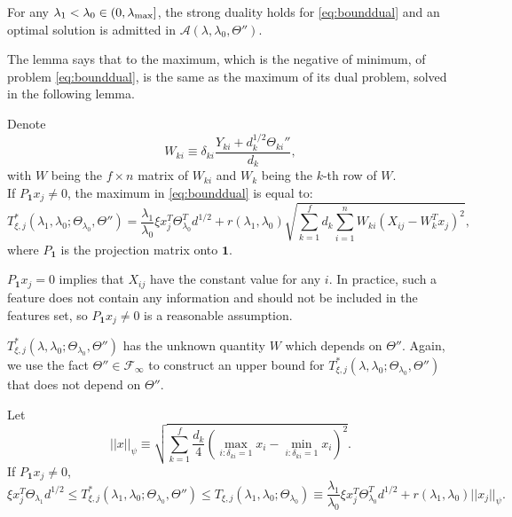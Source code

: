 \begin{lemma}
    \label{lem:2}
    For any $\lambda_1<\lambda_{0}\in (0,\lambda_\textnormal{max}]$, the strong duality holds for \eqref{eq:bounddual} and an optimal solution is admitted in $\mathcal{A}(\lambda,{\lambda_0},\Theta'')$.
\end{lemma}

The lemma says that to the maximum, which is the negative of minimum, of problem \eqref{eq:bounddual}, is the same as the maximum of its dual problem, solved in the following lemma.

\begin{lemma}
    \label{lem:3}
    Denote
    \begin{equation}
        \label{eq:w}
        W_{ki}\equiv\delta_{ki}\frac{Y_{ki}+d_k^{1/2}\Theta_{ki}''}{d_k},
    \end{equation}
    with $W$ being the $f\times n$ matrix of $W_{ki}$ and $W_k$ being the $k$-th row of $W$.\\
    If $P_{\mathbf{1}}x_j\neq 0$, the maximum in \eqref{eq:bounddual} is equal to:
    \begin{equation}
        \label{eq:tstar}
        T^*_{\xi,j}(\lambda_1,\lambda_0;\Theta_{\lambda_0},\Theta'')=\frac{\lambda_1}{\lambda_0}\xi x_j^T\Theta_{\lambda_0}^Td^{1/2}+r(\lambda_1,\lambda_0)\sqrt{\sum_{k=1}^fd_k\sum_{i=1}^nW_{ki}\left(X_{ij}-W_k^Tx_j\right)^2},
    \end{equation}
    where $P_{\mathbf{1}}$ is the projection matrix onto $\mathbf{1}$.
\end{lemma}

$P_{\mathbf{1}}x_j=0$ implies that $X_{ij}$ have the constant value for any $i$. In practice, such a feature does not contain any information and should not be included in the features set, so $P_{\mathbf{1}}x_j\neq 0$ is a reasonable assumption.

$T^*_{\xi,j}(\lambda,\lambda_0;\Theta_{\lambda_0},\Theta'')$ has the unknown quantity $W$ which depends on $\Theta''$. Again, we use the fact $\Theta''\in\mathcal{F}_\infty$ to construct an upper bound for $T^*_{\xi,j}(\lambda,\lambda_0;\Theta_{\lambda_0},\Theta'')$ that does not depend on $\Theta''$.

\begin{theorem}
    \label{thm:2}
    Let
    \begin{equation}
        \label{eq:prod}
        ||x||_\psi\equiv\sqrt{\sum_{k=1}^f\frac{d_k}{4}\left(\max_{i:\delta_{ki}=1}x_i-\min_{i:\delta_{ki}=1}x_i\right)^2}.
    \end{equation}
    If $P_{\mathbf{1}}x_j\neq 0$,
    \begin{equation}
        \label{eq:gbbar}
        \xi x_j^T\Theta_{\lambda_1}d^{1/2}\leq T^*_{\xi,j}(\lambda_1,\lambda_0;\Theta_{\lambda_0},\Theta'')\leq T_{\xi,j}(\lambda_1,\lambda_0;\Theta_{\lambda_0})\equiv\frac{\lambda_1}{\lambda_0}\xi x_j^T\Theta_{\lambda_0}^Td^{1/2}+r(\lambda_1,\lambda_0)||x_j||_\psi.
    \end{equation}
\end{theorem}

